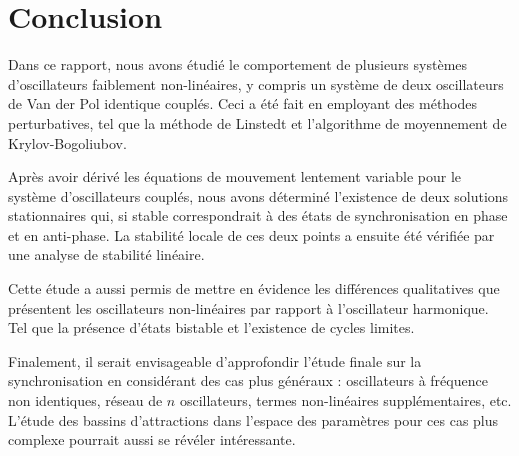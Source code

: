 \chapter{Conclusion}
%
Dans ce rapport, nous avons étudié le comportement
de plusieurs systèmes d'oscillateurs faiblement non-linéaires, y compris un système de
deux oscillateurs de Van der Pol identique couplés.
Ceci a été fait en employant des méthodes perturbatives, 
tel que la méthode de Linstedt et l'algorithme de moyennement de Krylov-Bogoliubov.

Après avoir dérivé les équations de mouvement lentement variable pour le système 
d'oscillateurs couplés, nous avons déterminé l'existence de deux solutions stationnaires qui,
si stable correspondrait à des états de synchronisation en phase et en anti-phase.
La stabilité locale de ces deux points a ensuite été vérifiée par une analyse de stabilité linéaire.

Cette étude a aussi permis de mettre en évidence les différences qualitatives
que présentent les oscillateurs non-linéaires par rapport à l'oscillateur harmonique.
Tel que la présence d'états bistable et l'existence de cycles limites.

Finalement, il serait envisageable d'approfondir l'étude finale sur la synchronisation en considérant des
cas plus généraux : oscillateurs à fréquence non identiques, réseau de $n$ oscillateurs, termes non-linéaires supplémentaires, etc.
L'étude des bassins d'attractions dans l'espace des paramètres pour ces cas plus complexe pourrait
aussi se révéler intéressante.
%
%
%
%
%
%
